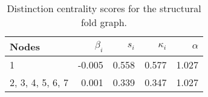 \begin{table}
\centering
\caption{\label{tab:sf}Distinction centrality scores for the structural fold graph.}
\centering
\begin{tabular}[t]{lrrrr}
\toprule
Nodes & $\beta_i$ & $s_i$ & $\kappa_i$ & $\alpha$\\
\midrule
1 & -0.005 & 0.558 & 0.577 & 1.027\\
2, 3, 4, 5, 6, 7 & 0.001 & 0.339 & 0.347 & 1.027\\
\bottomrule
\end{tabular}
\end{table}
